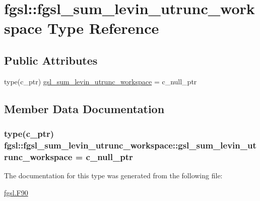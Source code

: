 \hypertarget{structfgsl_1_1fgsl__sum__levin__utrunc__workspace}{\section{fgsl\-:\-:fgsl\-\_\-sum\-\_\-levin\-\_\-utrunc\-\_\-workspace Type Reference}
\label{structfgsl_1_1fgsl__sum__levin__utrunc__workspace}
}
\subsection*{Public Attributes}
\begin{DoxyCompactItemize}
\item 
type(c\-\_\-ptr) \hyperlink{structfgsl_1_1fgsl__sum__levin__utrunc__workspace_a0be7a408bfe2c998883c74a9b3285c5f}{gsl\-\_\-sum\-\_\-levin\-\_\-utrunc\-\_\-workspace} = c\-\_\-null\-\_\-ptr
\end{DoxyCompactItemize}


\subsection{Member Data Documentation}
\hypertarget{structfgsl_1_1fgsl__sum__levin__utrunc__workspace_a0be7a408bfe2c998883c74a9b3285c5f}{
\subsubsection[{gsl\-\_\-sum\-\_\-levin\-\_\-utrunc\-\_\-workspace}]{\setlength{\rightskip}{0pt plus 5cm}type(c\-\_\-ptr) fgsl\-::fgsl\-\_\-sum\-\_\-levin\-\_\-utrunc\-\_\-workspace\-::gsl\-\_\-sum\-\_\-levin\-\_\-utrunc\-\_\-workspace = c\-\_\-null\-\_\-ptr}}\label{structfgsl_1_1fgsl__sum__levin__utrunc__workspace_a0be7a408bfe2c998883c74a9b3285c5f}


The documentation for this type was generated from the following file\-:\begin{DoxyCompactItemize}
\item 
\hyperlink{fgsl_8F90}{fgsl.\-F90}\end{DoxyCompactItemize}
